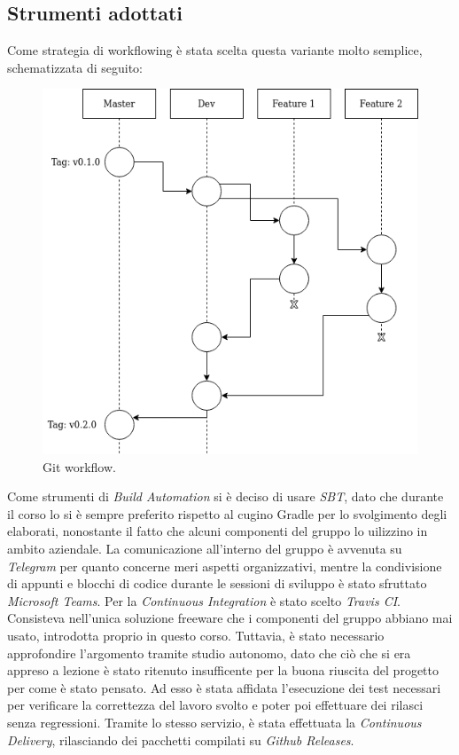 \documentclass[a4paper,10pt]{article}
\begin{document}
    \subsection{Strumenti adottati}
    Come strategia di workflowing è stata scelta questa variante molto semplice, schematizzata di seguito:
    \begin{center}
        \begin{figure}
            \caption{Git workflow.}
            \includegraphics[width=\textwidth, scale=0.8]{git-workflow-1-1.png}
        \end{figure}
    \end{center}
    Come strumenti di \textit{Build Automation} si è deciso di usare \textit{SBT}, dato che durante il corso lo si è
    sempre preferito rispetto al cugino Gradle per lo svolgimento degli elaborati, nonostante il fatto che alcuni
    componenti del gruppo lo uilizzino in ambito aziendale.
    La comunicazione all'interno del gruppo è avvenuta su \textit{Telegram} per quanto concerne meri aspetti
    organizzativi, mentre la condivisione di appunti e blocchi di codice durante le sessioni di sviluppo è stato
    sfruttato \textit{Microsoft Teams}.
    Per la \textit{Continuous Integration} è stato scelto \textit{Travis CI}. Consisteva nell'unica soluzione freeware
    che i componenti del gruppo abbiano mai usato, introdotta proprio in questo corso. Tuttavia, è stato necessario
    approfondire l'argomento tramite studio autonomo, dato che ciò che si era appreso a lezione è stato ritenuto
    insufficente per la buona riuscita del progetto per come è stato pensato. Ad esso è stata affidata l'esecuzione dei
    test necessari per verificare la correttezza del lavoro svolto e poter poi effettuare dei rilasci senza regressioni.
    Tramite lo stesso servizio, è stata effettuata la \textit{Continuous Delivery}, rilasciando dei pacchetti compilati
    su \textit{Github Releases}.
\end{document}
